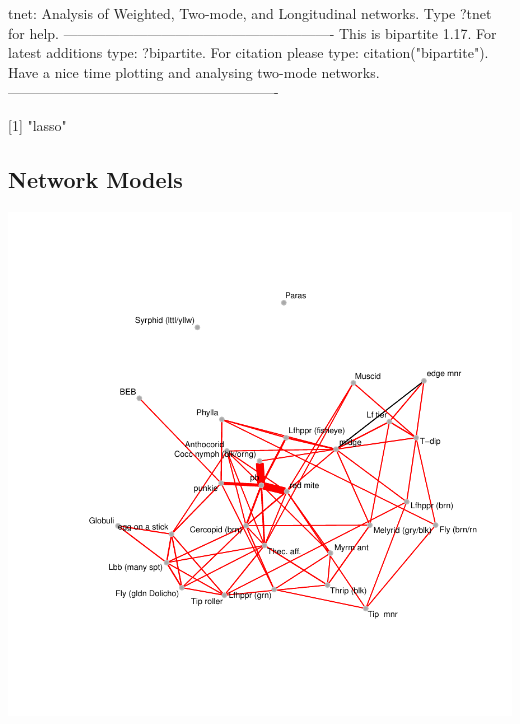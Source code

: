 \documentclass[12pt]{article}
\begin{document}
\begin{Schunk}
\begin{Soutput}
tnet: Analysis of Weighted, Two-mode, and Longitudinal networks.
Type ?tnet for help.
----------------------------------------------------------
This is bipartite 1.17. 
For latest additions type: ?bipartite.
For citation please type: citation("bipartite").
Have a nice time plotting and analysing two-mode networks.
----------------------------------------------------------

[1] "lasso"
\end{Soutput}
\end{Schunk}



\subsection{Network Models}



\includegraphics{pb_removal-018}
\end{document}
